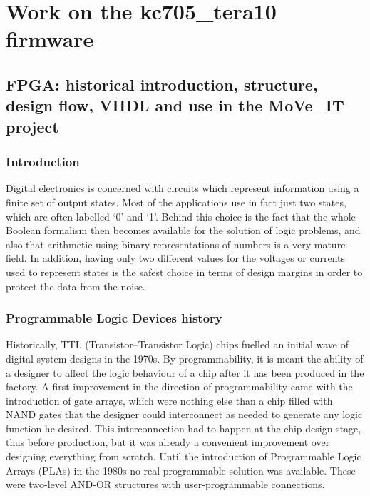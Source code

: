 \part{Work on the kc705\_tera10 firmware}

\chapter{FPGA: historical introduction, structure, design flow, VHDL and use in the MoVe\_IT project}
\section{Introduction}
\noindent Digital electronics is concerned with circuits which represent information using a finite set of output
states. Most of the applications use in fact just two states, which are often labelled ‘0’ and ‘1’.
Behind this choice is the fact that the whole Boolean formalism then becomes available for the
solution of logic problems, and also that arithmetic using binary representations of numbers is a very
mature field\cite{fpga1}.
\newline
In addition, having only two
different values for the voltages or currents used to represent states is the safest choice in terms of
design margins in order to protect the data from the noise.



\section{Programmable Logic Devices history}
\noindent Historically, TTL (Transistor–Transistor Logic) chips fuelled an initial wave of digital system designs in
the 1970s.
By programmability, it is meant the ability of a
designer to affect the logic behaviour of a chip after it has been produced in the factory.
\newline
\noindent A first improvement in the direction of programmability came with the introduction of gate
arrays, which were nothing else than a chip filled with NAND gates that the designer could
interconnect as needed to generate any logic function he desired.
This interconnection had to happen
at the chip design stage, thus before production, but it was already a convenient improvement over
designing everything from scratch. Until the introduction of Programmable Logic
Arrays (PLAs) in the 1980s no real programmable solution was available. These were two-level AND-OR
structures with user-programmable connections.

